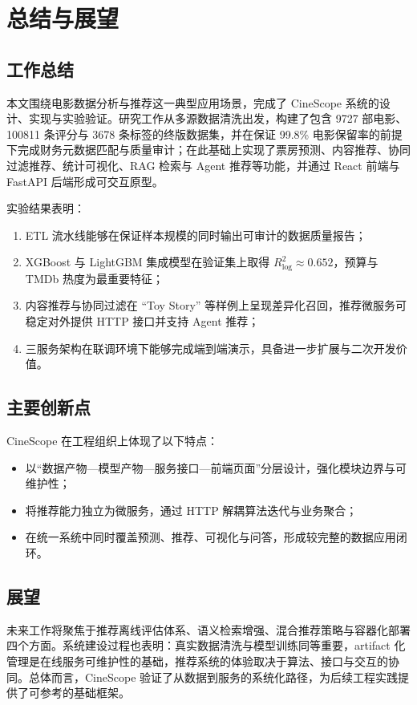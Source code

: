\chapter{总结与展望}
\label{chap:conclusion}

\section{工作总结}
\label{sec:conclusion:summary}

本文围绕电影数据分析与推荐这一典型应用场景，完成了 CineScope 系统的设计、实现与实验验证。研究工作从多源数据清洗出发，构建了包含 9727 部电影、100811 条评分与 3678 条标签的终版数据集，并在保证 99.8\% 电影保留率的前提下完成财务元数据匹配与质量审计；在此基础上实现了票房预测、内容推荐、协同过滤推荐、统计可视化、RAG 检索与 Agent 推荐等功能，并通过 React 前端与 FastAPI 后端形成可交互原型。

实验结果表明：

\begin{enumerate}
    \item ETL 流水线能够在保证样本规模的同时输出可审计的数据质量报告；
    \item XGBoost 与 LightGBM 集成模型在验证集上取得 $R^2_{\log} \approx 0.652$，预算与 TMDb 热度为最重要特征；
    \item 内容推荐与协同过滤在 ``Toy Story'' 等样例上呈现差异化召回，推荐微服务可稳定对外提供 HTTP 接口并支持 Agent 推荐；
    \item 三服务架构在联调环境下能够完成端到端演示，具备进一步扩展与二次开发价值。
\end{enumerate}

\section{主要创新点}
\label{sec:conclusion:innovation}

CineScope 在工程组织上体现了以下特点：

\begin{itemize}
    \item 以“数据产物—模型产物—服务接口—前端页面”分层设计，强化模块边界与可维护性；
    \item 将推荐能力独立为微服务，通过 HTTP 解耦算法迭代与业务聚合；
    \item 在统一系统中同时覆盖预测、推荐、可视化与问答，形成较完整的数据应用闭环。
\end{itemize}

\section{展望}
\label{sec:conclusion:outlook}

未来工作将聚焦于推荐离线评估体系、语义检索增强、混合推荐策略与容器化部署四个方面。系统建设过程也表明：真实数据清洗与模型训练同等重要，artifact 化管理是在线服务可维护性的基础，推荐系统的体验取决于算法、接口与交互的协同。总体而言，CineScope 验证了从数据到服务的系统化路径，为后续工程实践提供了可参考的基础框架。

